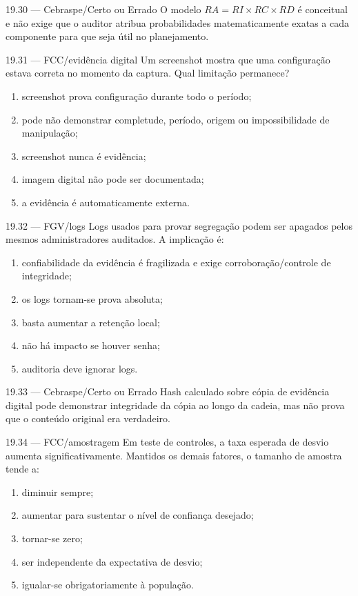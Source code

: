 \begin{questao}{ 19.30 — Cebraspe/Certo ou Errado}
O modelo $RA=RI\times RC\times RD$ é conceitual e não exige que o auditor atribua probabilidades matematicamente exatas a cada componente para que seja útil no planejamento.
\end{questao}

\begin{questao}{ 19.31 — FCC/evidência digital}
Um screenshot mostra que uma configuração estava correta no momento da captura. Qual limitação permanece?
\begin{enumerate}[label=\Alph*)]
\item screenshot prova configuração durante todo o período;
\item pode não demonstrar completude, período, origem ou impossibilidade de manipulação;
\item screenshot nunca é evidência;
\item imagem digital não pode ser documentada;
\item a evidência é automaticamente externa.
\end{enumerate}
\end{questao}

\begin{questao}{ 19.32 — FGV/logs}
Logs usados para provar segregação podem ser apagados pelos mesmos administradores auditados. A implicação é:
\begin{enumerate}[label=\Alph*)]
\item confiabilidade da evidência é fragilizada e exige corroboração/controle de integridade;
\item os logs tornam-se prova absoluta;
\item basta aumentar a retenção local;
\item não há impacto se houver senha;
\item auditoria deve ignorar logs.
\end{enumerate}
\end{questao}

\begin{questao}{ 19.33 — Cebraspe/Certo ou Errado}
Hash calculado sobre cópia de evidência digital pode demonstrar integridade da cópia ao longo da cadeia, mas não prova que o conteúdo original era verdadeiro.
\end{questao}

\begin{questao}{ 19.34 — FCC/amostragem}
Em teste de controles, a taxa esperada de desvio aumenta significativamente. Mantidos os demais fatores, o tamanho de amostra tende a:
\begin{enumerate}[label=\Alph*)]
\item diminuir sempre;
\item aumentar para sustentar o nível de confiança desejado;
\item tornar-se zero;
\item ser independente da expectativa de desvio;
\item igualar-se obrigatoriamente à população.
\end{enumerate}
\end{questao}

